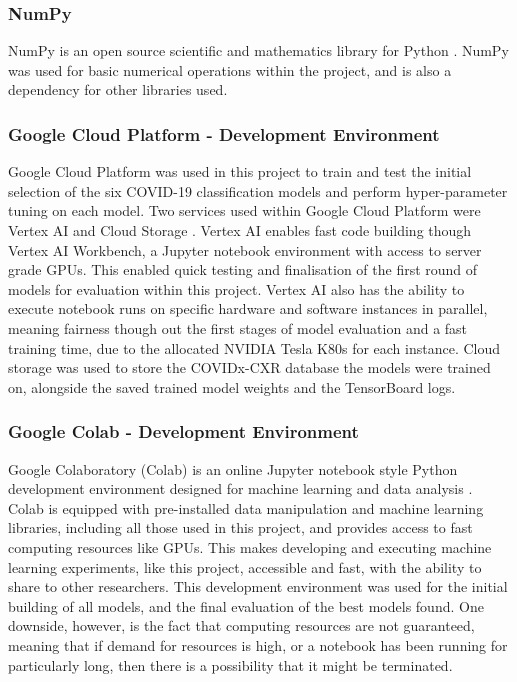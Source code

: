 \subsubsection{NumPy}
NumPy is an open source scientific and mathematics library for Python \citep{NumPy90:online}. NumPy was used for basic numerical operations within the project, and is also a dependency for other libraries used.

\subsubsection{Google Cloud Platform - Development Environment}
Google Cloud Platform was used in this project to train and test the initial selection of the six COVID-19 classification models and perform hyper-parameter tuning on each model. Two services used within Google Cloud Platform were Vertex AI \citep{VertexAI57:online} and Cloud Storage \citep{CloudSto72:online}. Vertex AI enables fast code building though Vertex AI Workbench, a Jupyter notebook environment with access to server grade GPUs. This enabled quick testing and finalisation of the first round of models for evaluation within this project. Vertex AI also has the ability to execute notebook runs on specific hardware and software instances in parallel, meaning fairness though out the first stages of model evaluation and a fast training time, due to the allocated NVIDIA Tesla K80s for each instance. Cloud storage was used to store the COVIDx-CXR database the models were trained on, alongside the saved trained model weights and the TensorBoard logs.

\subsubsection{Google Colab - Development Environment}
Google Colaboratory (Colab) is an online Jupyter notebook style Python development environment designed for machine learning and data analysis \citep{GoogleCo52:online}. Colab is equipped with pre-installed data manipulation and machine learning libraries, including all those used in this project, and provides access to fast computing resources like GPUs. This makes developing and executing machine learning experiments, like this project, accessible and fast, with the ability to share to other researchers. This development environment was used for the initial building of all models, and the final evaluation of the best models found. One downside, however, is the fact that computing resources are not guaranteed, meaning that if demand for resources is high, or a notebook has been running for particularly long, then there is a possibility that it might be terminated.

